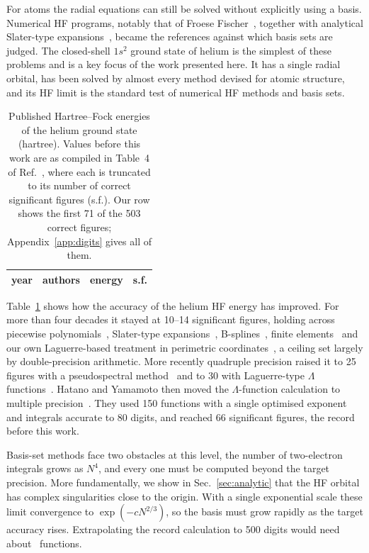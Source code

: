 \documentclass[aps,pra,reprint,superscriptaddress,amsmath,amssymb,longbibliography]{revtex4-2}
\begin{document}
For atoms the radial equations can still be solved without explicitly using a basis. Numerical HF programs, notably that of Froese Fischer~\cite{FroeseFischer1977}, together with analytical Slater-type expansions~\cite{Roothaan1960,Clementi1974}, became the references against which basis sets are judged. The closed-shell $1s^2$ ground state of helium is the simplest of these problems and is a key focus of the work presented here. It has a single radial orbital, has been solved by almost every method devised for atomic structure, and its HF limit is the standard test of numerical HF methods and basis sets.

\begin{table}[t]
\caption{Published Hartree--Fock energies of the helium ground state (hartree). Values before this work are as compiled in Table~4 of Ref.~\cite{Hatano2025}, where each is truncated to its number of correct significant figures (s.f.). Our row shows the first 71 of the 503 correct figures; Appendix~\ref{app:digits} gives all of them.}
\label{tab:hist}
\footnotesize
\begin{ruledtabular}
\begin{tabular}{rlll}
year & authors & energy & s.f. \\
\hline

\end{tabular}
\end{ruledtabular}
\end{table}

Table~\ref{tab:hist} shows how the accuracy of the helium HF energy has improved. For more than four decades it stayed at 10--14 significant figures, holding across piecewise polynomials~\cite{Gazquez1977}, Slater-type expansions~\cite{Koga1995}, B-splines~\cite{Saito2009}, finite elements~\cite{Lehtola2019} and our own Laguerre-based treatment in perimetric coordinates~\cite{King2018}, a ceiling set largely by double-precision arithmetic. More recently quadruple precision raised it to 25 figures with a pseudospectral method~\cite{Cinal2020} and to 30 with Laguerre-type $\Lambda$ functions~\cite{Hatano2020}. Hatano and Yamamoto then moved the $\Lambda$-function calculation to multiple precision~\cite{Hatano2025}. They used 150 functions with a single optimised exponent and integrals accurate to 80 digits, and reached 66 significant figures, the record before this work.

Basis-set methods face two obstacles at this level, the number of two-electron integrals grows as $N^4$, and every one must be computed beyond the target precision. More fundamentally, we show in Sec.~\ref{sec:analytic} that the HF orbital has complex singularities close to the origin. With a single exponential scale these limit convergence to $\exp(-cN^{2/3})$, so the basis must grow rapidly as the target accuracy rises. Extrapolating the record calculation to 500 digits would need about \Nfive\ functions.
\end{document}
